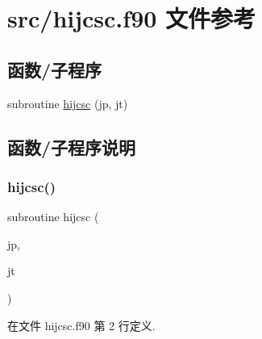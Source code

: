 \hypertarget{hijcsc_8f90}{}\section{src/hijcsc.f90 文件参考}
\label{hijcsc_8f90}
\subsection*{函数/子程序}
\begin{DoxyCompactItemize}
\item 
subroutine \mbox{\hyperlink{hijcsc_8f90_a9ea79faaa7a824d3f7c85d8a4c7c27f0}{hijcsc}} (jp, jt)
\end{DoxyCompactItemize}


\subsection{函数/子程序说明}
\mbox{\label{hijcsc_8f90_a9ea79faaa7a824d3f7c85d8a4c7c27f0}} 
\subsubsection{\texorpdfstring{hijcsc()}{hijcsc()}}
{\footnotesize\ttfamily subroutine hijcsc (\begin{DoxyParamCaption}\item[{}]{jp,  }\item[{}]{jt }\end{DoxyParamCaption})}



在文件 hijcsc.\+f90 第 2 行定义.


